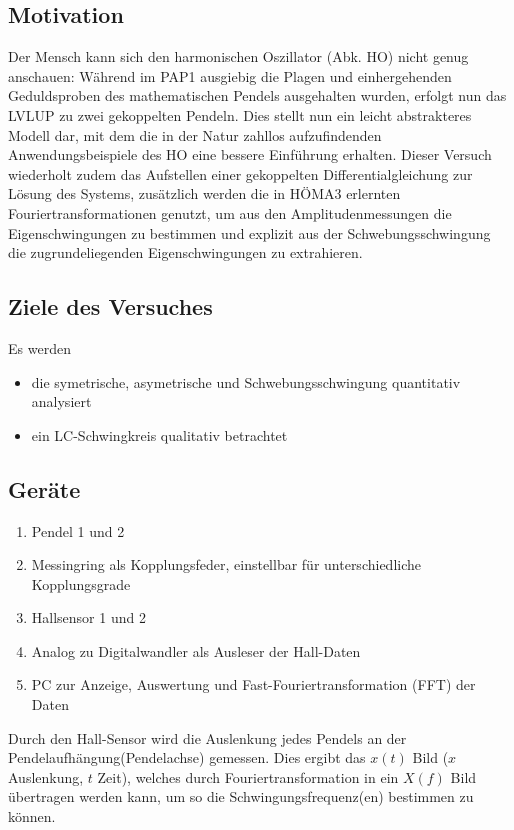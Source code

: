\subsection{Motivation}
Der Mensch kann sich den harmonischen Oszillator (Abk. HO) nicht genug anschauen: Während im PAP1 ausgiebig die Plagen und einhergehenden Geduldsproben des mathematischen Pendels ausgehalten wurden, erfolgt nun das LVLUP zu zwei gekoppelten Pendeln. Dies stellt nun ein leicht abstrakteres Modell dar, mit dem die in der Natur zahllos aufzufindenden Anwendungsbeispiele des HO eine bessere Einführung erhalten.  
Dieser Versuch wiederholt zudem das Aufstellen einer gekoppelten Differentialgleichung zur Lösung des Systems, zusätzlich werden die in HÖMA3 erlernten Fouriertransformationen genutzt, um aus den Amplitudenmessungen die Eigenschwingungen zu bestimmen und explizit aus der Schwebungsschwingung die zugrundeliegenden Eigenschwingungen zu extrahieren.


\subsection{Ziele des Versuches}
Es werden 
\begin{itemize}
    \item die symetrische, asymetrische und Schwebungsschwingung quantitativ analysiert
    \item ein LC-Schwingkreis qualitativ betrachtet
\end{itemize}

\newpage
\subsection{Geräte}
\begin{enumerate}
    \item Pendel 1 und 2
    \item Messingring als Kopplungsfeder, einstellbar für unterschiedliche Kopplungsgrade
    \item Hallsensor 1 und 2
    \item Analog zu Digitalwandler als Ausleser der Hall-Daten 
    \item PC zur Anzeige, Auswertung und Fast-Fouriertransformation (FFT) der Daten
\end{enumerate}
Durch den Hall-Sensor wird die Auslenkung jedes Pendels an der Pendelaufhängung(Pendelachse) gemessen. Dies ergibt das \(x(t)\) Bild (\(x\) Auslenkung, \(t\) Zeit), welches durch Fouriertransformation in ein \(X(f)\) Bild übertragen werden kann, um so die Schwingungsfrequenz(en) bestimmen zu können.

